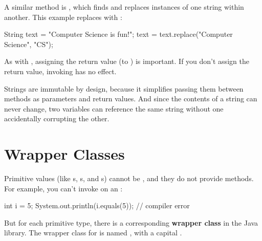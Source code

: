 
A similar method is , which finds and replaces instances of one string within another.
This example replaces  with :

\begin{code}
String text = "Computer Science is fun!";
text = text.replace("Computer Science", "CS");
\end{code}


As with , assigning the return value (to ) is important.
If you don't assign the return value, invoking  has no effect.


Strings are immutable by design, because it simplifies passing them between methods as parameters and return values.
And since the contents of a string can never change, two variables can reference the same string without one accidentally corrupting the other.


\section{Wrapper Classes}

Primitive values (like s, s, and s) cannot be , and they do not provide methods.
For example, you can't invoke  on an :

\begin{code}
int i = 5;
System.out.println(i.equals(5));  // compiler error
\end{code}


But for each primitive type, there is a corresponding {\bf wrapper class} in the Java library.
The wrapper class for  is named , with a capital .

